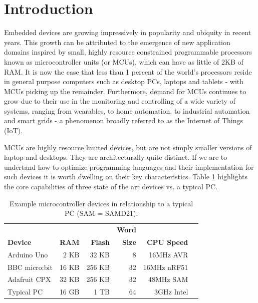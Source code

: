 \section{Introduction}
\label{sec:intro}

Embedded devices are growing impressively in popularity and ubiquity in recent years.
This growth can be attributed to the emergence of new application domains inspired by small,
highly resource constrained programmable processors known as microcontroller units (or MCUs),
which can have as little of 2KB of RAM. It is now the case that less than 1 percent of
the world's processors reside in general purpose computers such as desktop PCs, laptops and tablets
- with MCUs picking up the remainder.
Furthermore, demand for MCUs continues to grow due to their use in the monitoring and
controlling of a wide variety of systems, ranging from wearables, to home automation, to
industrial automation and smart grids - a phenomenon broadly referred to as the Internet of Things (IoT).

MCUs are highly resource limited devices, but are not simply smaller versions of laptop and desktops.
They are architecturally quite distinct. If we are to undertand how to optimize
programming languages and their implementation for such devices it is worth dwelling on their key characteristics.
Table \ref{table:devices} highlights the core capabilities of three state of the art devices vs. a typical PC.

\begin{table}[]
    \centering
    \begin{tabular}{|l|r|r|r|r|r|}
    \hline
                           &          &              & \bf{Word}  &                 \\
    \bf{Device}            & \bf{RAM} & \bf{Flash}   & \bf{Size}  & \bf{CPU Speed}  \\ \hline
    Arduino Uno            & 2 KB       & 32 KB      & 8          & 16MHz AVR       \\ \hline
    BBC micro:bit          & 16 KB      & 256 KB     & 32         & 16MHz nRF51     \\ \hline
    Adafruit CPX           & 32 KB      & 256 KB     & 32         & 48MHz SAM    \\ \hline
    Typical PC             & 16 GB      & 1 TB       & 64         & 3GHz Intel      \\ \hline
    \end{tabular}
    \caption{\label{table:devices}Example microcontroller devices in relationship to a typical PC (SAM = SAMD21).}
    \end{table}


